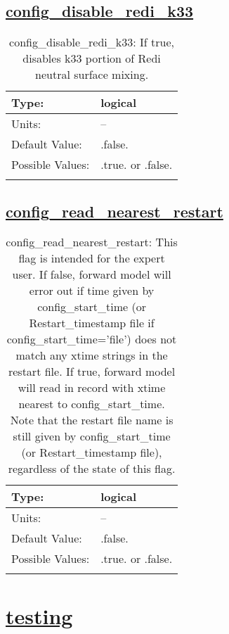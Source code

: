 \subsection[config\_disable\_redi\_k33]{\hyperref[sec:nm_tab_debug]{config\_disable\_redi\_k33}}
\label{subsec:nm_sec_config_disable_redi_k33}
\begin{center}
\begin{longtable}{| p{2.0in} || p{4.0in} |}
    \hline
    Type: & logical \\
    \hline
    Units: & -- \\
    \hline
    Default Value: & .false. \\
    \hline
    Possible Values: & .true. or .false. \\
    \hline
    \caption{config\_disable\_redi\_k33: If true, disables k33 portion of Redi neutral surface mixing.}
\end{longtable}
\end{center}
\subsection[config\_read\_nearest\_restart]{\hyperref[sec:nm_tab_debug]{config\_read\_nearest\_restart}}
\label{subsec:nm_sec_config_read_nearest_restart}
\begin{center}
\begin{longtable}{| p{2.0in} || p{4.0in} |}
    \hline
    Type: & logical \\
    \hline
    Units: & -- \\
    \hline
    Default Value: & .false. \\
    \hline
    Possible Values: & .true. or .false. \\
    \hline
    \caption{config\_read\_nearest\_restart: This flag is intended for the expert user.  If false, forward model will error out if time given by config\_start\_time (or Restart\_timestamp file if config\_start\_time='file') does not match any xtime strings in the restart file.  If true, forward model will read in record with xtime nearest to config\_start\_time.  Note that the restart file name is still given by config\_start\_time (or Restart\_timestamp file), regardless of the state of this flag.}
\end{longtable}
\end{center}
\section[testing]{\hyperref[sec:nm_tab_testing]{testing}}
\label{sec:nm_sec_testing}
